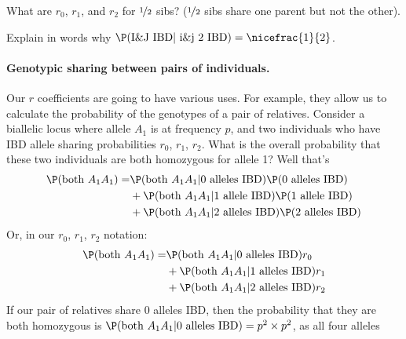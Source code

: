 {{\begin{question}{}
  What are $r_0$, $r_1$, and $r_2$ for $\nicefrac{1}{2}$ sibs? ($\nicefrac{1}{2}$ sibs share one
parent but not the other).
\end{question}

\begin{question}{}
  Explain in words why $ \P(\text{I\&J IBD} |~ \text{i\&j  2 IBD}) = \nicefrac{1}{2}$.
\end{question}


\paragraph{Genotypic sharing between pairs of individuals.}
Our $r$ coefficients are going to have various uses. For example, they allow us
to calculate the probability of the genotypes of a pair of
relatives. Consider a biallelic locus where allele $A_1$ is
at frequency $p$, and two individuals who have IBD allele sharing
probabilities $r_0$, $r_1$, $r_2$. What is the overall probability that these
two individuals are both homozygous for allele 1? Well that's
\begin{align}
  \P(\textrm{both } A_1 A_1) = & \P(\textrm{both } A_1 A_1 | \text{0 alleles IBD}) \P(\text{0 alleles IBD})  \nonumber\\
  & + \P(\textrm{both } A_1 A_1 | \text{1 allele IBD}) \P(\text{1 allele IBD})  \nonumber\\
  &+ \P(\textrm{both } A_1 A_1 | \text{2 alleles IBD}) \P(\text{2 alleles IBD})
\end{align}
Or, in our $r_0$, $r_1$, $r_2$ notation:
\begin{align}
  \P(\textrm{both } A_1 A_1) = & \P(\textrm{both } A_1 A_1 | \text{0 alleles IBD}) r_0  \nonumber\\
  & + \P(\textrm{both } A_1 A_1 |
  \text{1 alleles IBD}) r_1  \nonumber\\
  & + \P(\textrm{both } A_1 A_1 | \text{2 alleles IBD}) r_2 \label{eqn:initial_relly_IBD_calc}
\end{align}
If our pair of relatives share $0$ alleles IBD, then the probability that
they are both homozygous is $\P(\textrm{both } A_1 A_1 |
\text{0 alleles IBD}) =p^2 \times p^2$, as all four alleles
}}
